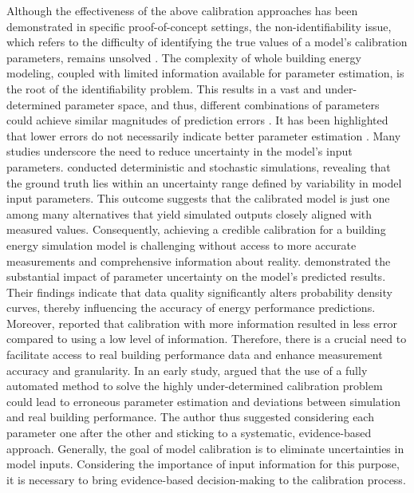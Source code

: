 \documentclass[3p,times,12pt]{elsarticle}
\begin{document}
\begin{sloppypar}
Although the effectiveness of the above calibration approaches has been demonstrated in specific proof-of-concept settings, the non-identifiability issue, which refers to the difficulty of identifying the true values of a model’s calibration parameters, remains unsolved \cite{arendt2012improving, menberg2017efficiency, chong2018guidelines}. 
The complexity of whole building energy modeling, coupled with limited information available for parameter estimation, is the root of the identifiability problem. This results in a vast and under-determined parameter space, and thus, different combinations of parameters could achieve similar magnitudes of prediction errors \cite{Zhan2023sep}. It has been highlighted that lower errors do not necessarily indicate better parameter estimation \cite{angelotti2023calibrating}. Many studies underscore the need to reduce uncertainty in the model's input parameters. \cite{scortegagna2023can} conducted deterministic and stochastic simulations, revealing that the ground truth lies within an uncertainty range defined by variability in model input parameters. This outcome suggests that the calibrated model is just one among many alternatives that yield simulated outputs closely aligned with measured values. Consequently, achieving a credible calibration for a building energy simulation model is challenging without access to more accurate measurements and comprehensive information about reality. \cite{ekstrom2021evaluating} demonstrated the substantial impact of parameter uncertainty on the model's predicted results. Their findings indicate that data quality significantly alters probability density curves, thereby influencing the accuracy of energy performance predictions. Moreover, \citet{risch2021influence} reported that calibration with more information resulted in less error compared to using a low level of information. Therefore, there is a crucial need to facilitate access to real building performance data and enhance measurement accuracy and granularity. In an early study, \citet{bertagnolio2012evidence} argued that the use of a fully automated method to solve the highly under-determined calibration problem could lead to erroneous parameter estimation and deviations between simulation and real building performance. The author thus suggested considering each parameter one after the other and sticking to a systematic, evidence-based approach. Generally, the goal of model calibration is to eliminate uncertainties in model inputs. Considering the importance of input information for this purpose, it is necessary to bring evidence-based decision-making to the calibration process.  


\end{sloppypar}
\end{document}
